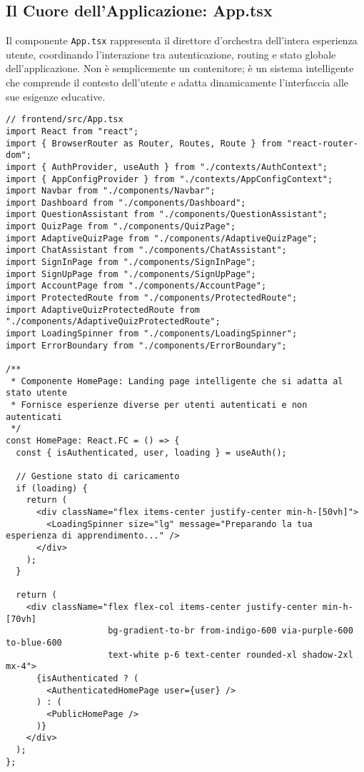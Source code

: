 \documentclass[a4paper, 14pt, oneside]{extbook}
\begin{document}
\subsection{Il Cuore dell'Applicazione: App.tsx}

Il componente \texttt{App.tsx} rappresenta il direttore d'orchestra dell'intera esperienza utente, coordinando l'interazione tra autenticazione, routing e stato globale dell'applicazione. Non è semplicemente un contenitore; è un sistema intelligente che comprende il contesto dell'utente e adatta dinamicamente l'interfaccia alle sue esigenze educative.

\begin{lstlisting}[style=javascriptstyle, caption=Componente App React - Orchestrazione Intelligente, label=lst:app-component]
// frontend/src/App.tsx
import React from "react";
import { BrowserRouter as Router, Routes, Route } from "react-router-dom";
import { AuthProvider, useAuth } from "./contexts/AuthContext";
import { AppConfigProvider } from "./contexts/AppConfigContext";
import Navbar from "./components/Navbar";
import Dashboard from "./components/Dashboard";
import QuestionAssistant from "./components/QuestionAssistant";
import QuizPage from "./components/QuizPage";
import AdaptiveQuizPage from "./components/AdaptiveQuizPage";
import ChatAssistant from "./components/ChatAssistant";
import SignInPage from "./components/SignInPage";
import SignUpPage from "./components/SignUpPage";
import AccountPage from "./components/AccountPage";
import ProtectedRoute from "./components/ProtectedRoute";
import AdaptiveQuizProtectedRoute from "./components/AdaptiveQuizProtectedRoute";
import LoadingSpinner from "./components/LoadingSpinner";
import ErrorBoundary from "./components/ErrorBoundary";

/**
 * Componente HomePage: Landing page intelligente che si adatta al stato utente
 * Fornisce esperienze diverse per utenti autenticati e non autenticati
 */
const HomePage: React.FC = () => {
  const { isAuthenticated, user, loading } = useAuth();

  // Gestione stato di caricamento
  if (loading) {
    return (
      <div className="flex items-center justify-center min-h-[50vh]">
        <LoadingSpinner size="lg" message="Preparando la tua esperienza di apprendimento..." />
      </div>
    );
  }

  return (
    <div className="flex flex-col items-center justify-center min-h-[70vh] 
                    bg-gradient-to-br from-indigo-600 via-purple-600 to-blue-600 
                    text-white p-6 text-center rounded-xl shadow-2xl mx-4">
      {isAuthenticated ? (
        <AuthenticatedHomePage user={user} />
      ) : (
        <PublicHomePage />
      )}
    </div>
  );
};


\end{lstlisting}
\end{document}
